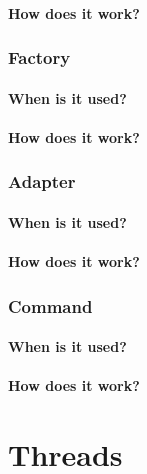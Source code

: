 \documentclass[12pt]{article}
\theoremstyle{definition}
\begin{document}
\subsection{How does it work?}

\section{Factory}
\subsection{When is it used?}

\subsection{How does it work?}

\section{Adapter}
\subsection{When is it used?}

\subsection{How does it work?}

\section{Command}
\subsection{When is it used?}

\subsection{How does it work?}

\part{Threads}
\end{document}
